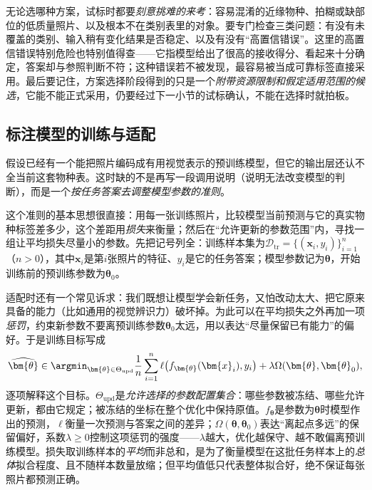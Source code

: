 无论选哪种方案，试标时都要\emph{刻意挑难的来考}：容易混淆的近缘物种、拍糊或缺部位的低质量照片、以及根本不在类别表里的对象。要专门检查三类问题：有没有未覆盖的类别、输入稍有变化结果是否稳定、以及有没有“高置信错误”。这里的高置信错误特别危险也特别值得查——它指模型给出了很高的接收得分、看起来十分确定，答案却与参照判断不符；这种错误若不被发现，最容易被当成可靠标签直接采用。最后要记住，方案选择阶段得到的只是一个\emph{附带资源限制和假定适用范围的候选}，它能不能正式采用，仍要经过下一小节的试标确认，不能在选择时就拍板。

\subsection{标注模型的训练与适配}
\label{sec:knowledge-acquisition-model-training-adaptation}

假设已经有一个能把照片编码成有用视觉表示的预训练模型，但它的输出层还认不全当前这套物种表。这时缺的不是再写一段调用说明（说明无法改变模型的判断），而是一个\emph{按任务答案去调整模型参数的准则}。

这个准则的基本思想很直接：用每一张训练照片，比较模型当前预测与它的真实物种标签差多少，这个差距用\emph{损失}来衡量；然后在“允许更新的参数范围”内，寻找一组让平均损失尽量小的参数。先把记号列全：训练样本集为$\mathcal{D}_{\mathrm{tr}}=\{(\bm{x}_i,y_i)\}_{i=1}^{n}$（$n>0$），其中$\bm{x}_i$是第$i$张照片的特征、$y_i$是它的任务答案；模型参数记为$\bm{\theta}$，开始训练前的预训练参数为$\bm{\theta}_0$。

适配时还有一个常见诉求：我们既想让模型学会新任务，又怕改动太大、把它原来具备的能力（比如通用的视觉辨识力）破坏掉。为此可以在平均损失之外再加一项\emph{惩罚}，约束新参数不要离预训练参数$\bm{\theta}_0$太远，用以表达“尽量保留已有能力”的偏好。于是训练目标写成
\begin{equation}
  \widehat{\bm{\theta}}
  \in
  \argmin_{\bm{\theta}\in\Theta_{\mathrm{upd}}}
  \frac{1}{n}\sum_{i=1}^{n}\ell\!\left(f_{\bm{\theta}}(\bm{x}_i),y_i\right)
  +\lambda\Omega(\bm{\theta},\bm{\theta}_0),
  \label{eq:knowledge-acquisition-adaptation-objective}
\end{equation}
逐项解释这个目标。$\Theta_{\mathrm{upd}}$是\emph{允许选择的参数配置集合}：哪些参数被冻结、哪些允许更新，都由它规定；被冻结的坐标在整个优化中保持原值。$f_{\bm{\theta}}$是参数为$\bm{\theta}$时模型作出的预测，$\ell$衡量一次预测与答案之间的差异；$\Omega(\bm{\theta},\bm{\theta}_0)$表达“离起点多远”的保留偏好，系数$\lambda\geq0$控制这项惩罚的强度——$\lambda$越大，优化越保守、越不敢偏离预训练模型。损失取训练样本的\emph{平均}而非总和，是为了衡量模型在这批任务样本上的\emph{总体}拟合程度、且不随样本数量放缩；但平均值低只代表整体拟合好，绝不保证每张照片都预测正确。


